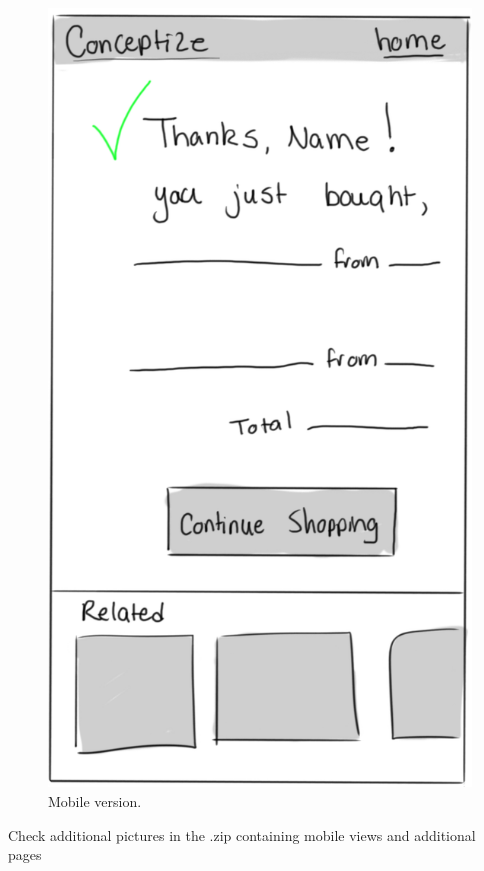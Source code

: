 \documentclass[]{article}
\begin{document}
\begin{enumerate}
		\begin{figure}
		  \includegraphics[width=\linewidth]{./pictures/confirmation_mobile.png}
		  \caption{Mobile version.}
		  \label{fig:mobile11}
		\end{figure}
	\end{enumerate}
	Check additional pictures in the .zip containing mobile views and additional pages
	
	\newpage
\end{document}
